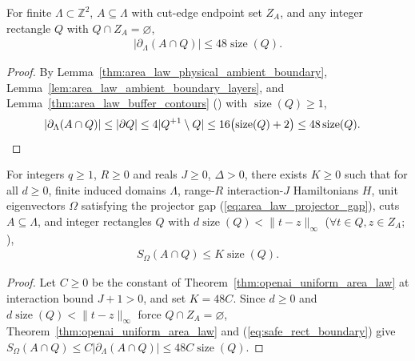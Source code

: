 \begin{lemma}
    \label{thm:area_law_safe_rectangle_boundary}
    \leanok
    For finite $\Lambda\subset\mathbb Z^2$, $A\subseteq\Lambda$ with cut-edge endpoint set $Z_A$, and any integer rectangle $Q$ with $Q\cap Z_A=\varnothing$,
    \begin{align}
        |\partial_\Lambda(A\cap Q)| \le 48\operatorname{size}(Q). \label{eq:safe_rect_boundary}
    \end{align}
\end{lemma}
\begin{proof}\leanok
    By Lemma~\ref{thm:area_law_physical_ambient_boundary}, Lemma~\ref{lem:area_law_ambient_boundary_layers}, and Lemma~\ref{thm:area_law_buffer_contours} (\cite[Lemma~9.4]{OpenAI2026AreaLaw}) with $\operatorname{size}(Q)\ge1$,
    \begin{align}
        |\partial_\Lambda(A\cap Q)|
         & \le |\partial Q|
        \le4|Q^{+1}\setminus Q|
        \le16\bigl(\operatorname{size}(Q)+2\bigr)
        \le48\operatorname{size}(Q).\notag
    \end{align}
\end{proof}

\begin{lemma}
    \label{thm:area_law_safe_rectangle_linear_entropy}
    \leanok
    For integers $q\ge1$, $R\ge0$ and reals $J\ge0$, $\Delta>0$, there exists $K\ge0$ such that for all $d\ge0$, finite induced domains $\Lambda$, range-$R$ interaction-$J$ Hamiltonians $H$, unit eigenvectors $\Omega$ satisfying the projector gap (\ref{eq:area_law_projector_gap}), cuts $A\subseteq\Lambda$, and integer rectangles $Q$ with $d\operatorname{size}(Q)<\|t-z\|_\infty$ ($\forall t\in Q,z\in Z_A$; \cite[Theorem~1.1, Section~3]{OpenAI2026AreaLaw}),
    \begin{align}
        S_\Omega(A\cap Q)\le K\operatorname{size}(Q). \label{eq:safe_rect_linear_entropy}
    \end{align}
\end{lemma}
\begin{proof}\leanok
    Let $C\ge0$ be the constant of Theorem~\ref{thm:openai_uniform_area_law} at interaction bound $J+1>0$, and set $K=48C$.
    Since $d\ge0$ and $d\operatorname{size}(Q)<\|t-z\|_\infty$ force $Q\cap Z_A=\varnothing$, Theorem~\ref{thm:openai_uniform_area_law} and (\ref{eq:safe_rect_boundary}) give $S_\Omega(A\cap Q)\le C|\partial_\Lambda(A\cap Q)|\le48C\operatorname{size}(Q)$.
\end{proof}

